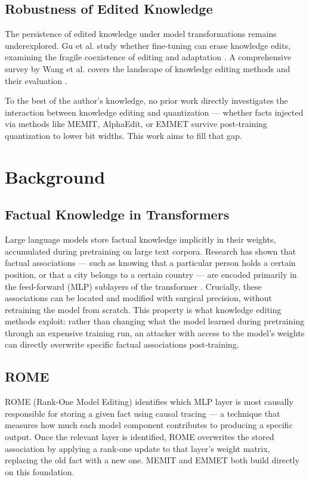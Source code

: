 \documentclass[conference]{IEEEtran}
\begin{document}
\subsection{Robustness of Edited Knowledge}

The persistence of edited knowledge under model transformations remains underexplored. Gu et al. study whether fine-tuning can erase knowledge edits, examining the fragile coexistence of editing and adaptation \cite{b8}. A comprehensive survey by Wang et al. covers the landscape of knowledge editing methods and their evaluation \cite{b9}.

To the best of the author's knowledge, no prior work directly investigates the interaction between knowledge editing and quantization --- whether facts injected via methods like MEMIT, AlphaEdit, or EMMET survive post-training quantization to lower bit widths. This work aims to fill that gap.

\section{Background}
\label{sec:background}

\subsection{Factual Knowledge in Transformers}

Large language models store factual knowledge implicitly in their weights, accumulated during pretraining on large text corpora. Research has shown that factual associations --- such as knowing that a particular person holds a certain position, or that a city belongs to a certain country --- are encoded primarily in the feed-forward (MLP) sublayers of the transformer \cite{b11}. Crucially, these associations can be located and modified with surgical precision, without retraining the model from scratch. This property is what knowledge editing methods exploit: rather than changing what the model learned during pretraining through an expensive training run, an attacker with access to the model's weights can directly overwrite specific factual associations post-training.

\subsection{ROME}

ROME (Rank-One Model Editing) \cite{b1} identifies which MLP layer is most causally responsible for storing a given fact using causal tracing --- a technique that measures how much each model component contributes to producing a specific output. Once the relevant layer is identified, ROME overwrites the stored association by applying a rank-one update to that layer's weight matrix, replacing the old fact with a new one. MEMIT and EMMET both build directly on this foundation.
\end{document}
